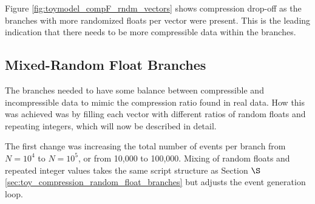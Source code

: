 Figure \ref{fig:toymodel_compF_rndm_vectors} shows compression drop-off as the branches with more randomized floats per vector were present.
This is the leading indication that there needs to be more compressible data within the branches. 

\subsection{Mixed-Random Float Branches}
The branches needed to have some balance between compressible and incompressible data to mimic the compression ratio found in real data.
How this was achieved was by filling each vector with different ratios of random floats and repeating integers, which will now be described in detail.

The first change was increasing the total number of events per branch from $N = 10^4$ to $N = 10^5$, or from 10,000 to 100,000. 
Mixing of random floats and repeated integer values takes the same script structure as Section $\S$ \ref{sec:toy_compression_random_float_branches} but adjusts the event generation loop.
